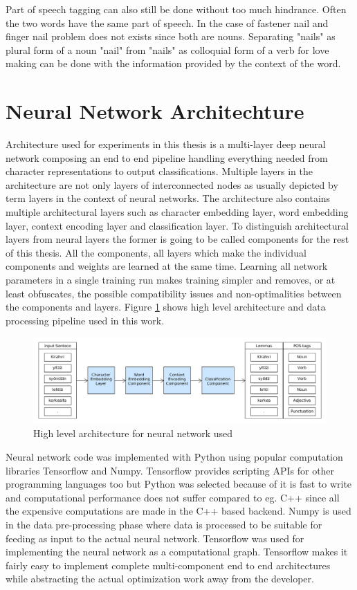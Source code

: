 \documentclass[12pt,a4paper,english
]{tutthesis}
\begin{document}
Part of speech tagging can also still be done without too much hindrance. Often the two words have the same part of speech. In the case of fastener nail and finger nail problem does not exists since both are nouns. Separating "nails" as plural form of a noun "nail" from "nails" as colloquial form of a verb for love making can be done with the information provided by the context of the word.


\section{Neural Network Architechture}
\label{se:architecture}
Architecture used for experiments in this thesis is a multi-layer deep neural network composing an end to end pipeline handling everything needed from character representations to output classifications. Multiple layers in the architecture are not only layers of interconnected nodes as usually depicted by term layers in the context of neural networks. The architecture also contains multiple architectural layers such as character embedding layer, word embedding layer, context encoding layer and classification layer. To distinguish architectural layers from neural layers the former is going to be called components for the rest of this thesis. All the components, all layers which make the individual components and weights are learned at the same time. Learning all network parameters in a single training run makes training simpler and removes, or at least obfuscates, the possible compatibility issues and non-optimalities between the components and layers. Figure \ref{figure:architecture} shows high level architecture and data processing pipeline used in this work.

\begin{figure}[htbp]
\caption{High level architecture for neural network used}
\label{figure:architecture}
\centering
\includegraphics[width=15cm]{architecture.png}
\end{figure}

Neural network code was implemented with Python using popular computation libraries Tensorflow and Numpy. Tensorflow provides scripting APIs for other programming languages too but Python was selected because of it is fast to write and computational performance does not suffer compared to eg. C++ since all the expensive computations are made in the C++ based backend. Numpy is used in the data pre-processing phase where data is processed to be suitable for feeding as input to the actual neural network. Tensorflow was used for implementing the neural network as a computational graph. Tensorflow makes it fairly easy to implement complete multi-component end to end architectures while abstracting the actual optimization work away from the developer.
\end{document}
